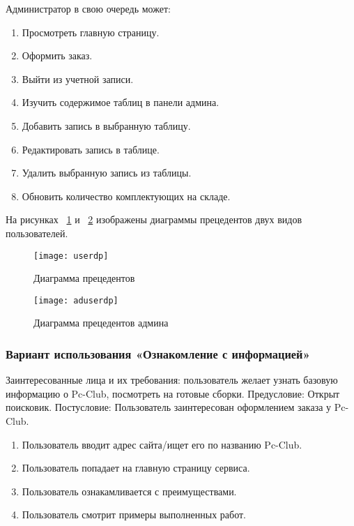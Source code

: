 Администратор в свою очередь может:
\begin{enumerate}
	\item Просмотреть главную страницу.
	\item Оформить заказ.
	\item Выйти из учетной записи.
	\item Изучить содержимое таблиц в панели админа.
	\item Добавить запись в выбранную таблицу.
	\item Редактировать запись в таблице.
	\item Удалить выбранную запись из таблицы.
	\item Обновить количество комплектующих на складе.
\end{enumerate}

На рисунках ~\ref{userdp:image} и ~\ref{aduserdp:image} изображены диаграммы прецедентов двух видов пользователей.
\begin{figure}[h]
	\texttt{[image: userdp]}
	\caption{Диаграмма прецедентов}
	\label{userdp:image}
\end{figure}
\clearpage
\begin{figure}[h]
	\texttt{[image: aduserdp]}
	\caption{Диаграмма прецедентов админа}
	\label{aduserdp:image}
\end{figure}
\clearpage

\subsubsection{Вариант использования «Ознакомление с информацией»}
Заинтересованные лица и их требования: пользователь желает узнать базовую информацию о Pc-Club, посмотреть на готовые сборки.
Предусловие: Открыт поисковик.
Постусловие: Пользователь заинтересован оформлением заказа у Pc-Club.
\begin{enumerate}
	\item Пользователь вводит адрес сайта/ищет его по названию Pc-Club.
	\item Пользователь попадает на главную страницу сервиса.
	\item Пользователь ознакамливается с преимуществами.
	\item Пользователь смотрит примеры выполненных работ.
\end{enumerate}

